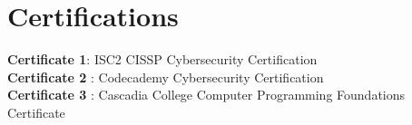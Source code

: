 \documentclass[letterpaper,11pt]{article}
\makeatletter
\newcommand{\resumeItem}[1]{
  \item\small{
    {#1 \vspace{-2pt}}
  }
}
\newcommand{\resumeProjectHeading}[2]{
    \item
    \begin{tabular*}{1.001\textwidth}{l@{\extracolsep{\fill}}r}
      \small#1 & \textbf{\small #2}\\
    \end{tabular*}\vspace{-7pt}
}
\newcommand{\resumeSubHeadingListStart}{\begin{itemize}[leftmargin=0.0in, label={}]}
\newcommand{\resumeSubHeadingListEnd}{\end{itemize}}
\newcommand{\resumeItemListStart}{\begin{itemize}}
\newcommand{\resumeItemListEnd}{\end{itemize}\vspace{-5pt}}
\makeatother
\begin{document}
\begin{comment}
\section{Publication}
\vspace{-6pt}
    \resumeSubHeadingListStart
    \resumeProjectHeading
    {\textbf{The Title of your paper} $|$ 
    \emph{\href{https://www.researchgate.net}{Publication link}}}{Month Year}
    \resumeItemListStart
            \resumeItem{Write about your paper.}
            \resumeItem{Write about your paper.}
          \resumeItemListEnd
    \resumeSubHeadingListEnd
\vspace{-16pt}
\end{comment}

\section{Certifications}
\textbf{Certificate 1}{: ISC2 CISSP Cybersecurity Certification} \\
\textbf{Certificate 2} {: Codecademy Cybersecurity Certification} \\
\textbf{Certificate 3} {: Cascadia College Computer Programming Foundations Certificate}
\end{document}
